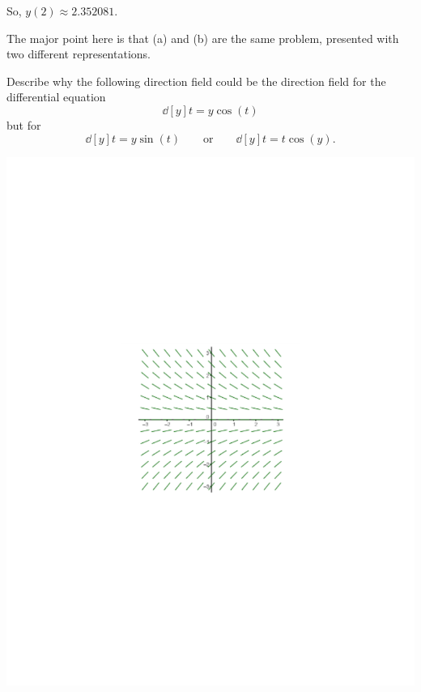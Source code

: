 \documentclass[noinstructornotes]{ximera}
\begin{document}
\begin{problem}
\begin{enumerate}
\begin{freeResponse}
	So, $y(2) \approx 2.352081$.
	\end{freeResponse}
	\end{enumerate}
	
\end{problem}

\begin{instructorNotes}
The major point here is that (a) and (b) are the same problem, presented with two different representations.
\end{instructorNotes}







\begin{problem}
Describe why the following direction field could be the direction field for the differential equation 
	\[
	\dd[y]{t} = y \cos(t)
	\]
but  for 
	\[
	\dd[y]{t} = y \sin(t) 	\qquad	\text{or}	\qquad	\dd[y]{t} = t \cos(y).
	\]
	
	\begin{image}
	\includegraphics[trim= 300 280 250 280,scale=0.8]{Figure8-2-2.pdf}
	\end{image}
	\begin{freeResponse}
		

\end{freeResponse}
\end{problem}
\end{document}
